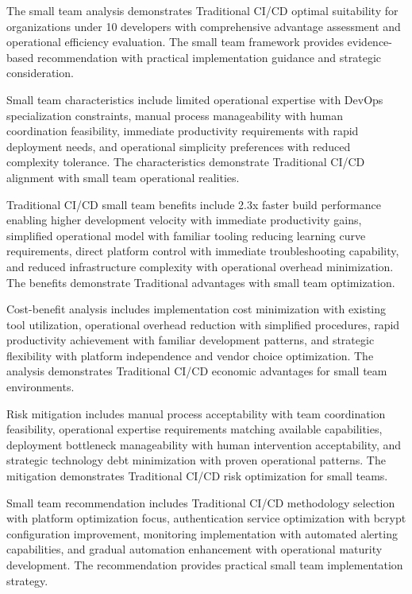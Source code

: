 The small team analysis demonstrates Traditional CI/CD optimal suitability for organizations under 10 developers with comprehensive advantage assessment and operational efficiency evaluation. The small team framework provides evidence-based recommendation with practical implementation guidance and strategic consideration.

Small team characteristics include limited operational expertise with DevOps specialization constraints, manual process manageability with human coordination feasibility, immediate productivity requirements with rapid deployment needs, and operational simplicity preferences with reduced complexity tolerance. The characteristics demonstrate Traditional CI/CD alignment with small team operational realities.

Traditional CI/CD small team benefits include 2.3x faster build performance enabling higher development velocity with immediate productivity gains, simplified operational model with familiar tooling reducing learning curve requirements, direct platform control with immediate troubleshooting capability, and reduced infrastructure complexity with operational overhead minimization. The benefits demonstrate Traditional advantages with small team optimization.

Cost-benefit analysis includes implementation cost minimization with existing tool utilization, operational overhead reduction with simplified procedures, rapid productivity achievement with familiar development patterns, and strategic flexibility with platform independence and vendor choice optimization. The analysis demonstrates Traditional CI/CD economic advantages for small team environments.

Risk mitigation includes manual process acceptability with team coordination feasibility, operational expertise requirements matching available capabilities, deployment bottleneck manageability with human intervention acceptability, and strategic technology debt minimization with proven operational patterns. The mitigation demonstrates Traditional CI/CD risk optimization for small teams.

Small team recommendation includes Traditional CI/CD methodology selection with platform optimization focus, authentication service optimization with bcrypt configuration improvement, monitoring implementation with automated alerting capabilities, and gradual automation enhancement with operational maturity development. The recommendation provides practical small team implementation strategy.

